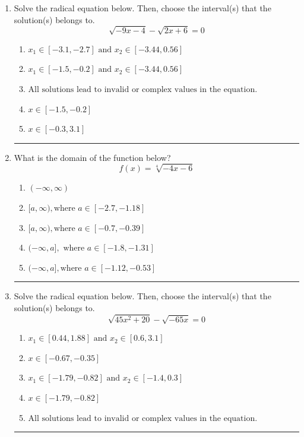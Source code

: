 \documentclass[14pt]{extbook}
\newcommand{\litem}[1]{\item#1\hspace*{-1cm}\rule{\textwidth}{0.4pt}}
\begin{document}
\begin{enumerate}
\litem{
Solve the radical equation below. Then, choose the interval(s) that the solution(s) belongs to.\[ \sqrt{-9 x - 4} - \sqrt{2 x + 6} = 0 \]\begin{enumerate}[label=\Alph*.]
\item \( x_1 \in [-3.1, -2.7] \text{ and } x_2 \in [-3.44,0.56] \)
\item \( x_1 \in [-1.5, -0.2] \text{ and } x_2 \in [-3.44,0.56] \)
\item \( \text{All solutions lead to invalid or complex values in the equation.} \)
\item \( x \in [-1.5,-0.2] \)
\item \( x \in [-0.3,3.1] \)

\end{enumerate} }
\litem{
What is the domain of the function below?\[ f(x) = \sqrt[4]{-4 x - 6} \]\begin{enumerate}[label=\Alph*.]
\item \( (-\infty, \infty) \)
\item \( [a, \infty), \text{where } a \in [-2.7, -1.18] \)
\item \( [a, \infty), \text{where } a \in [-0.7, -0.39] \)
\item \( (-\infty, a], \text{ where } a \in [-1.8, -1.31] \)
\item \( (-\infty, a], \text{where } a \in [-1.12, -0.53] \)

\end{enumerate} }
\litem{
Solve the radical equation below. Then, choose the interval(s) that the solution(s) belongs to.\[ \sqrt{45 x^2 + 20} - \sqrt{-65 x} = 0 \]\begin{enumerate}[label=\Alph*.]
\item \( x_1 \in [0.44, 1.88] \text{ and } x_2 \in [0.6,3.1] \)
\item \( x \in [-0.67,-0.35] \)
\item \( x_1 \in [-1.79, -0.82] \text{ and } x_2 \in [-1.4,0.3] \)
\item \( x \in [-1.79,-0.82] \)
\item \( \text{All solutions lead to invalid or complex values in the equation.} \)


\end{enumerate}}
\end{enumerate}
\end{document}
